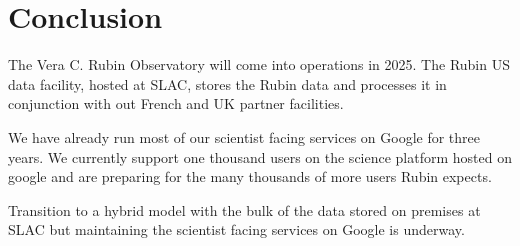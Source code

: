 \section{Conclusion} \label{sec:conc}
The Vera C. Rubin Observatory will come into operations in 2025.
The Rubin US data facility, hosted at SLAC, stores the Rubin data and processes it in conjunction with out French and UK partner facilities.

We have already run most of our scientist facing services on Google for three years.
We currently support one thousand users on the science platform hosted on google and are preparing for the many thousands of more users Rubin expects.

Transition to a hybrid model with the bulk of the data stored on premises at SLAC but maintaining the scientist facing services on Google is underway.


